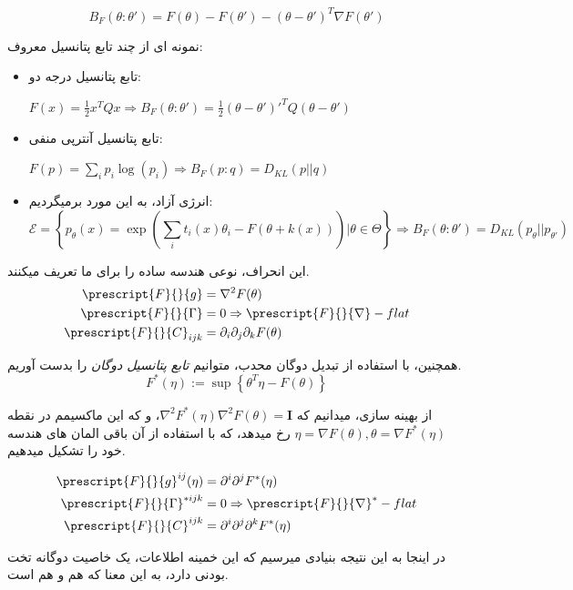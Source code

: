$$B_F(\theta:\theta')=F(\theta)-F(\theta')-(\theta-\theta')^T\nabla F(\theta')$$

نمونه ای از چند تابع پتانسیل معروف:

\begin{itemize}
    \item تابع پتانسیل درجه دو:\\ \centerline{$F(x)=\frac{1}{2}x^TQx\Rightarrow B_F(\theta:\theta')=\frac{1}{2}(\theta-\theta')'^TQ(\theta-\theta')$}
    \item تابع پتانسیل آنترپی منفی:\\ \centerline{$F(p)=\sum_ip_i\log(p_i)\Rightarrow B_F(p:q)=D_{KL}(p||q)$}
    \item انرژی آزاد، به این مورد برمیگردیم: $$\mathcal{E}=\left\{p_\theta(x)=\exp(\sum_it_i(x)\theta_i-F(\theta+k(x)))|\theta\in\Theta\right\}\Rightarrow B_F(\theta:\theta')=D_{KL}(p_\theta||p_{\theta'})$$
\end{itemize}

این انحراف، نوعی هندسه ساده را برای ما تعریف میکنند.
\begin{align*}
    \prescript{F}{}{g}&=\nabla^2F(\theta)\\
    \prescript{F}{}{\Gamma}&=0\Rightarrow\prescript{F}{}{\nabla}-flat\\
    \prescript{F}{}{C}_{ijk}&=\partial_i\partial_j\partial_kF(\theta)
\end{align*}

همچنین، با استفاده از تبدیل دوگان محدب، متوانیم \textit{تابع پتانسیل دوگان} را بدست آوریم.
$$
 F^*(\eta):=\sup\left\{\theta^T\eta-F(\theta)\right\}
$$

از بهینه سازی، میدانیم که $\nabla^2F^*(\eta)\nabla^2F(\theta)=\mathbf{I}$، و که این ماکسیمم در نقطه $\eta=\nabla F(\theta), \theta=\nabla F^*(\eta)$ رخ میدهد، که با استفاده از آن باقی المان های هندسه خود را تشکیل میدهیم.

\begin{align*}
    \prescript{F}{}{g}^{ij}(\eta)&=\partial^i\partial^jF^*(\eta)\\
    \prescript{F}{}{\Gamma}^{*ijk}&=0\Rightarrow\prescript{F}{}{\nabla}^*-flat\\
    \prescript{F}{}{C}^{ijk}&=\partial^i\partial^j\partial^kF^*(\eta)
\end{align*}

در اینجا به این نتیجه بنیادی میرسیم که این خمینه اطلاعات، یک خاصیت دوگانه تخت بودنی دارد، به این معنا که هم  و هم  است.


